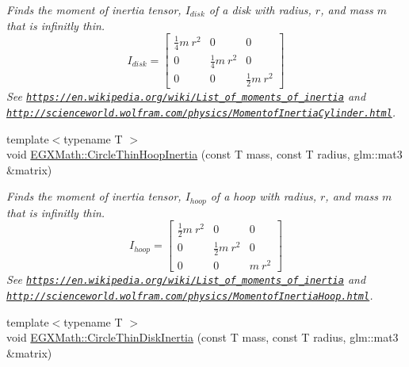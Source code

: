 \begin{DoxyCompactItemize}
\begin{DoxyCompactList}\small\item\em Finds the moment of inertia tensor, $I_{disk}$ of a disk with radius, $r$, and mass $m$ that is infinitly thin. \[ I_{disk}=\begin{bmatrix} \frac{1}{4}m\ r^2 & 0 & 0\\ 0 & \frac{1}{4}m\ r^2 & 0\\ 0 & 0 & \frac{1}{2}m\ r^2 \end{bmatrix} \] See \href{https://en.wikipedia.org/wiki/List_of_moments_of_inertia}{\tt https\+://en.\+wikipedia.\+org/wiki/\+List\+\_\+of\+\_\+moments\+\_\+of\+\_\+inertia} and \href{http://scienceworld.wolfram.com/physics/MomentofInertiaCylinder.html}{\tt http\+://scienceworld.\+wolfram.\+com/physics/\+Momentof\+Inertia\+Cylinder.\+html}. \end{DoxyCompactList}\item 
{\footnotesize template$<$typename T $>$ }\\void \mbox{\hyperlink{group___e_g_x_math-_geometry-2_d-_circle_ga5c84d0d64d475e472a75f4f10b4a0c26}{E\+G\+X\+Math\+::\+Circle\+Thin\+Hoop\+Inertia}} (const T mass, const T radius, glm\+::mat3 \&matrix)
\begin{DoxyCompactList}\small\item\em Finds the moment of inertia tensor, $I_{hoop}$ of a hoop with radius, $r$, and mass $m$ that is infinitly thin. \[ I_{hoop}=\begin{bmatrix} \frac{1}{2}m\ r^2 & 0 & 0\\ 0 & \frac{1}{2}m\ r^2 & 0\\ 0 & 0 & m\ r^2 \end{bmatrix} \] See \href{https://en.wikipedia.org/wiki/List_of_moments_of_inertia}{\tt https\+://en.\+wikipedia.\+org/wiki/\+List\+\_\+of\+\_\+moments\+\_\+of\+\_\+inertia} and \href{http://scienceworld.wolfram.com/physics/MomentofInertiaHoop.html}{\tt http\+://scienceworld.\+wolfram.\+com/physics/\+Momentof\+Inertia\+Hoop.\+html}. \end{DoxyCompactList}\item 
{\footnotesize template$<$typename T $>$ }\\void \mbox{\hyperlink{group___e_g_x_math-_geometry-2_d-_circle_ga2ccb30846977757242697e70983bbec5}{E\+G\+X\+Math\+::\+Circle\+Thin\+Disk\+Inertia}} (const T mass, const T radius, glm\+::mat3 \&matrix)

\end{DoxyCompactItemize}
